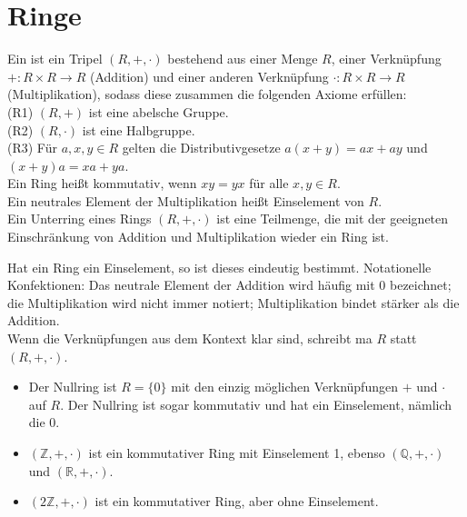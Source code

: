 \section{Ringe}

\begin{definition}[Ring]
	Ein  ist ein Tripel $(R,+,\cdot)$ bestehend aus einer Menge
	$R$, einer Verknüpfung $+: R \times R \to R$ (Addition) und einer anderen Verknüpfung
	$\cdot: R \times R \to R$ (Multiplikation), sodass diese zusammen die folgenden Axiome 
	erfüllen: \\
	(R1) $(R,+)$ ist eine abelsche Gruppe. \\
	(R2) $(R,\cdot)$ ist eine Halbgruppe. \\
	(R3) Für $a,x,y \in R$ gelten die Distributivgesetze $a(x+y)=ax+ay$ und $(x+y)a=xa+ya$. \\
	Ein Ring heißt kommutativ, wenn $xy=yx$ für alle $x,y \in R$.\\
	Ein neutrales Element der Multiplikation heißt Einselement von $R$.\\
	Ein Unterring eines Rings $(R,+,\cdot)$ ist eine Teilmenge, die mit der geeigneten
	Einschränkung von Addition und Multiplikation wieder ein Ring ist.
\end{definition}

\begin{remark}
	Hat ein Ring ein Einselement, so ist dieses eindeutig bestimmt. Notationelle Konfektionen: Das 
	neutrale Element der Addition wird häufig mit 0 bezeichnet; die Multiplikation wird nicht immer
	notiert; Multiplikation bindet stärker als die Addition. \\
	Wenn die Verknüpfungen aus dem Kontext klar sind, schreibt ma $R$ statt $(R,+,\cdot)$.
\end{remark}

\begin{example}
	\begin{itemize}
		\item Der Nullring ist $R=\{0\}$ mit den einzig möglichen Verknüpfungen $+$ und $\cdot$
		auf $R$. Der Nullring ist sogar kommutativ und hat ein Einselement, nämlich die 0.
		\item $(\mathbb{Z},+,\cdot)$ ist ein kommutativer Ring mit Einselement 1, ebenso
		$(\mathbb{Q},+,\cdot)$ und $(\mathbb{R},+,\cdot)$. 
		\item $(2\mathbb{Z},+,\cdot)$ ist ein kommutativer Ring, aber ohne Einselement.
	\end{itemize}
\end{example}

